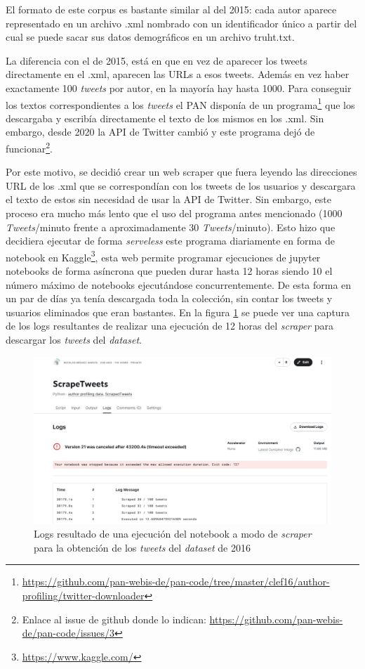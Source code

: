  El formato de este corpus es bastante similar al del 2015: cada autor aparece representado en un archivo .xml nombrado con un identificador único a partir del cual se puede sacar sus datos demográficos en un archivo truht.txt.
 
 La diferencia con el de 2015, está en que en vez de aparecer los tweets directamente en el .xml, aparecen las URLs a esos tweets. Además en vez haber exactamente 100 \textit{tweets} por autor, en la mayoría hay hasta 1000. Para conseguir los textos correspondientes a los \textit{tweets} el PAN disponía de un programa\footnote{\url{https://github.com/pan-webis-de/pan-code/tree/master/clef16/author-profiling/twitter-downloader}} que los descargaba y escribía directamente el texto de los mismos en los .xml. Sin embargo, desde 2020 la API de Twitter cambió y este programa dejó de funcionar\footnote{Enlace al issue de github donde lo indican: \url{https://github.com/pan-webis-de/pan-code/issues/3}}.
 
 Por este motivo, se decidió crear un web scraper que fuera leyendo las direcciones URL de los .xml que se correspondían con los tweets de los usuarios y descargara el texto de estos sin necesidad de usar la API de Twitter. Sin embargo, este proceso era mucho más lento que el uso del programa antes mencionado (1000 \textit{Tweets}/minuto frente a aproximadamente 30 \textit{Tweets}/minuto). Esto hizo que decidiera ejecutar de forma \textit{serveless} este programa diariamente en forma de notebook en Kaggle\footnote{\url{https://www.kaggle.com/}}, esta web permite programar ejecuciones de jupyter notebooks de forma asíncrona que pueden durar hasta 12 horas siendo 10 el número máximo de notebooks ejecutándose concurrentemente. De esta forma en un par de días ya tenía descargada toda la colección, sin contar los tweets y usuarios eliminados que eran bastantes. En la figura \ref{fig:scraper} se puede ver una captura de los logs resultantes de realizar una ejecución de 12 horas del \textit{scraper} para descargar los \textit{tweets} del \textit{dataset}.

 \noindent\begin{figure}[hp!]
  \centering
    \includegraphics[width=\textwidth]{imaxes/scraper.png}
  \caption{Logs resultado de una ejecución del notebook a modo de \textit{scraper} para la obtención de los \textit{tweets} del \textit{dataset} de 2016}
  \label{fig:scraper}
\end{figure}
 
